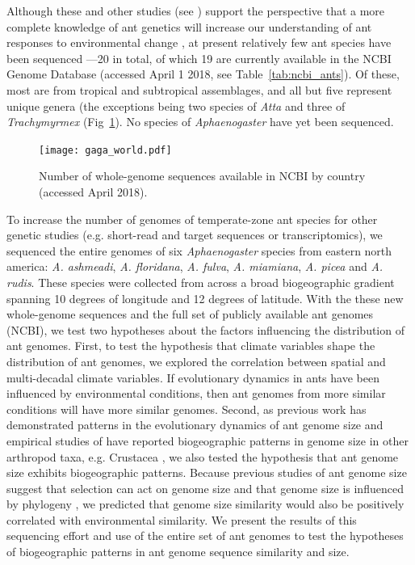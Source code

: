 \documentclass[fleqn,10pt,lineno]{wlpeerj} %
\begin{document}
Although these and other studies (see \cite{Nygaard2015}) support the
perspective that a more complete knowledge of ant genetics will
increase our understanding of ant responses to environmental change
\citep{Boomsma2017}, at present relatively few ant species have been
sequenced ---20 in total, of which 19 are currently available in the
NCBI Genome Database (accessed April 1 2018, see
Table~\ref{tab:ncbi_ants}). Of these, most are from tropical and
subtropical assemblages, and all but five represent unique genera (the
exceptions being two species of \textit{Atta} and three of
\textit{Trachymyrmex} (Fig~\ref{fig:ant_world_usa}). No species of
\textit{Aphaenogaster} have yet been sequenced.

\begin{figure}[ht]
\texttt{[image: gaga\_world.pdf]}
\caption{Number of whole-genome sequences available in NCBI by country
  (accessed April 2018).}
\label{fig:ant_world_usa}
\end{figure}



To increase the number of genomes of temperate-zone ant species for
other genetic studies (e.g. short-read and target sequences or
transcriptomics), we sequenced the entire genomes of six
\textit{Aphaenogaster} species from eastern north america:
\textit{A. ashmeadi}, \textit{A. floridana}, \textit{A. fulva},
\textit{A. miamiana}, \textit{A. picea} and \textit{A. rudis}. These
species were collected from across a broad biogeographic gradient
spanning 10 degrees of longitude and 12 degrees of latitude. With the
these new whole-genome sequences and the full set of publicly
available ant genomes (NCBI), we test two hypotheses about the factors
influencing the distribution of ant genomes. First, to test the
hypothesis that climate variables shape the distribution of ant
genomes, we explored the correlation between spatial and multi-decadal
climate variables. If evolutionary dynamics in ants have been
influenced by environmental conditions, then ant genomes from more
similar conditions will have more similar genomes. Second, as previous
work has demonstrated patterns in the evolutionary dynamics of ant
genome size \citep{Tsutsui2008a} and empirical studies of have
reported biogeographic patterns in genome size in other arthropod
taxa, e.g. Crustacea \citep{Hultgren2018}, we also tested the
hypothesis that ant genome size exhibits biogeographic
patterns. Because previous studies of ant genome size suggest that
selection can act on genome size and that genome size is influenced by
phylogeny \citep{Tsutsui2008a}, we predicted that genome size
similarity would also be positively correlated with environmental
similarity.  We present the results of this sequencing effort and use
of the entire set of ant genomes to test the hypotheses of
biogeographic patterns in ant genome sequence similarity and size.
\end{document}
